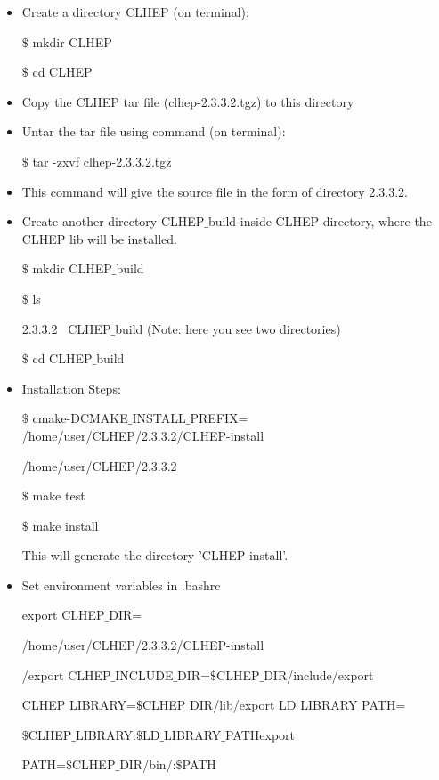 \begin{itemize}
	\item Create a directory CLHEP (on terminal):
	
	$\$ $ mkdir CLHEP
	
	$\$ $ cd CLHEP
	
	\item Copy the CLHEP tar file (clhep-2.3.3.2.tgz) to this directory 
	\item Untar the tar file using command (on terminal):
	
	$\$ $ tar -zxvf clhep-2.3.3.2.tgz
	 
	\item This command will give the source file in the form of directory 2.3.3.2.
	\item Create another directory CLHEP$\_$build inside CLHEP directory, where the CLHEP lib will be installed.
	
	$\$ $ mkdir CLHEP$\_$build
	
	$\$ $ ls
	
	 2.3.3.2  \,    CLHEP$\_$build  (Note: here you see two directories)
	 
	 $\$ $ cd CLHEP$\_$build
	 
	 \item Installation Steps:
	 
	 $\$ $ cmake-DCMAKE$\_$INSTALL$\_$PREFIX= /home/user/CLHEP/2.3.3.2/CLHEP-install 
	 
	 /home/user/CLHEP/2.3.3.2
	 
	 $\$ $ make test
	 
	 $\$ $ make install
	 
	 This will generate the directory 'CLHEP-install'.
	 \item Set environment variables in .bashrc
	 
	 export CLHEP$\_$DIR=
	 
	 /home/user/CLHEP/2.3.3.2/CLHEP-install
	 
	 /export CLHEP$\_$INCLUDE$\_$DIR=$\$${CLHEP$\_$DIR}/include/export
	 
	 CLHEP$\_$LIBRARY=$\$${CLHEP$\_$DIR}/lib/export LD$\_$LIBRARY$\_$PATH=
	 
	 $\$${CLHEP$\_$LIBRARY}:$\$${LD$\_$LIBRARY$\_$PATH}export
	 
	 PATH=$\$$CLHEP$\_$DIR/bin/:$\$$PATH
	
\end{itemize}

